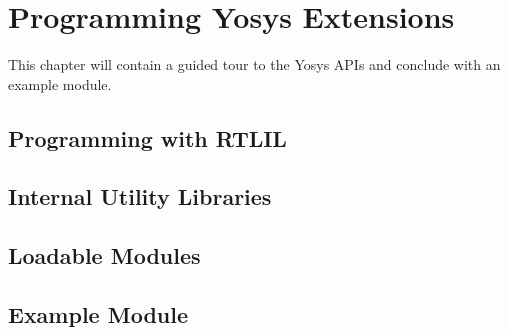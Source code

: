 
\chapter{Programming Yosys Extensions}
\label{chapter:prog}

\begin{fixme}
This chapter will contain a guided tour to the Yosys APIs and conclude
with an example module.
\end{fixme}

\section{Programming with RTLIL}
\section{Internal Utility Libraries}
\section{Loadable Modules}

\section{Example Module}







